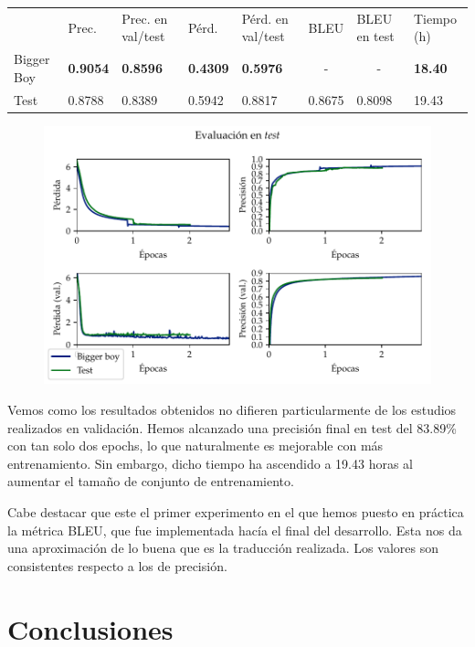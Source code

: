 \documentclass[a4paper, 20pt, dvipsnames]{article}
\begin{document}
\begin{table}[H]
	\centering
	\begin{tabular}{llllllll}
		& Prec.           & Prec. en val/test & Pérd.           & Pérd. en val/test & BLEU                  & BLEU en test          & Tiempo (h)     \\ \cline{2-8} 
		Bigger Boy & \textbf{0.9054} & \textbf{0.8596}   & \textbf{0.4309} & \textbf{0.5976}   & \multicolumn{1}{c}{-} & \multicolumn{1}{c}{-} & \textbf{18.40} \\
		Test       & 0.8788          & 0.8389            & 0.5942          & 0.8817            & 0.8675                & 0.8098                & 19.43         
	\end{tabular}
\end{table}

\begin{figure}[H]
	\centering
	\includegraphics{fig/lastboy.pdf}
\end{figure}

Vemos como los resultados obtenidos no difieren particularmente de los
estudios realizados en validación. Hemos alcanzado una precisión final en
test del 83.89\% con tan solo dos epochs, lo que naturalmente es mejorable
con más entrenamiento. Sin embargo, dicho tiempo ha ascendido a 19.43 horas
al aumentar el tamaño de conjunto de entrenamiento.

Cabe destacar que este el primer experimento en el que hemos puesto en
práctica la métrica BLEU, que fue implementada hacía el final del desarrollo.
Esta nos da una aproximación de lo buena que es la traducción realizada.
Los valores son consistentes respecto a los de precisión.

\section{Conclusiones}
\end{document}
